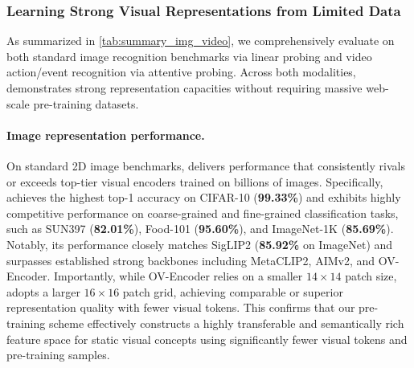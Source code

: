 \subsubsection{Learning Strong Visual Representations from Limited Data}
\label{sec:magevit_data_efficiency}

As summarized in \cref{tab:summary_img_video}, we comprehensively evaluate \magevit on both standard image recognition benchmarks via linear probing and video action/event recognition via attentive probing. Across both modalities, \magevit demonstrates strong representation capacities without requiring massive web-scale pre-training datasets.


\paragraph{Image representation performance.}
On standard 2D image benchmarks, \magevit delivers performance that consistently rivals or exceeds top-tier visual encoders trained on billions of images. Specifically, \magevit achieves the highest top-1 accuracy on CIFAR-10 (\textbf{99.33\%}) and exhibits highly competitive performance on coarse-grained and fine-grained classification tasks, such as SUN397 (\textbf{82.01\%}), Food-101 (\textbf{95.60\%}), and ImageNet-1K (\textbf{85.69\%}). Notably, its performance closely matches SigLIP2 (\textbf{85.92\%} on ImageNet) and surpasses established strong backbones including MetaCLIP2, AIMv2, and OV-Encoder. Importantly, while OV-Encoder relies on a smaller $14\times14$ patch size, \magevit adopts a larger $16\times16$ patch grid, achieving comparable or superior representation quality with fewer visual tokens. This confirms that our pre-training scheme effectively constructs a highly transferable and semantically rich feature space for static visual concepts using significantly fewer visual tokens and pre-training samples.


